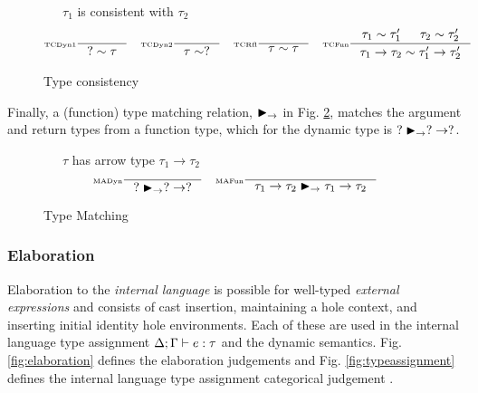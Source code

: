 \begin{figure}[H]
\small
{}\ \ \ $\tau_1$ is consistent with $\tau_2$
\tiny
\[\inference[\tiny TCDyn1]{}{? \sim \tau} \quad \inference[\tiny TCDyn2]{}{\tau \sim ?} \quad \inference[\tiny TCRfl]{}{\tau \sim \tau} \quad \inference[\tiny TCFun]{\tau_1 \sim \tau_1' & \tau_2 \sim \tau_2'}{\tau_1 \to \tau_2 \sim \tau_1' \to \tau_2'}\]
\caption{Type consistency}
\label{fig:consistency}
\end{figure}
Finally, a (function) type matching relation, $\blacktriangleright_\rightarrow$ in Fig. \ref{fig:typematching}, matches the argument and return types from a function type, which for the dynamic type is $? \blacktriangleright_\rightarrow ? -> ?$. 
\begin{figure}[h]
\small
{}\ \ \ $\tau$ has arrow type $\tau_1 \to \tau_2$
\tiny
\[\inference[\tiny MADyn]{}{? \funmatch ? \to ?} \quad 
\inference[\tiny MAFun]{}{\tau_1 \to \tau_2 \funmatch \tau_1 \to \tau_2}\]
\caption{Type Matching}
\label{fig:typematching}
\end{figure}


\subsubsection{Elaboration}
Elaboration to the \textit{internal language} is possible for well-typed \textit{external expressions} and consists of cast insertion, maintaining a hole context, and inserting initial identity hole environments. Each of these are used in the internal language type assignment $\Delta;\Gamma \vdash e : \tau$ and the dynamic semantics. Fig. \ref{fig:elaboration} defines the elaboration judgements and Fig. \ref{fig:typeassignment} defines the internal language type assignment categorical judgement \cite{ModalJudgements}.

